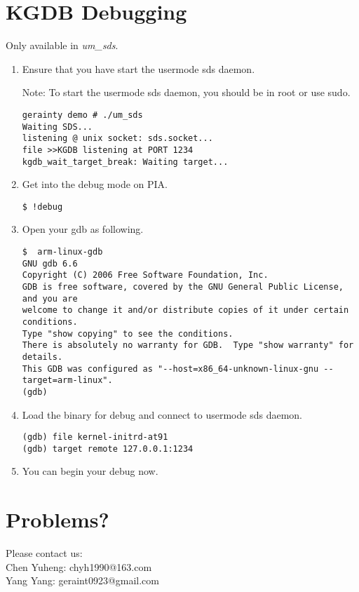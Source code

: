 \documentclass[a4paper]{article}
\begin{document}
\section{KGDB Debugging}
Only available in \emph{um\_sds}. 

\begin{enumerate}
\item Ensure that you have start the usermode sds daemon.

Note: To start the usermode sds daemon, you should be in root or use sudo.
\begin{verbatim}
gerainty demo # ./um_sds 
Waiting SDS...
listening @ unix socket: sds.socket...
file >>KGDB listening at PORT 1234
kgdb_wait_target_break: Waiting target...
\end{verbatim}

\item Get into the debug mode on PIA.


\begin{verbatim}
$ !debug
\end{verbatim}

\item Open your gdb as following.

{
\footnotesize
\begin{verbatim}
$  arm-linux-gdb
GNU gdb 6.6
Copyright (C) 2006 Free Software Foundation, Inc.
GDB is free software, covered by the GNU General Public License, and you are
welcome to change it and/or distribute copies of it under certain conditions.
Type "show copying" to see the conditions.
There is absolutely no warranty for GDB.  Type "show warranty" for details.
This GDB was configured as "--host=x86_64-unknown-linux-gnu --target=arm-linux".
(gdb) 
\end{verbatim}

}
\item Load the binary for debug and connect to usermode sds daemon.

\begin{verbatim}
(gdb) file kernel-initrd-at91
(gdb) target remote 127.0.0.1:1234
\end{verbatim}

\item You can begin your debug now.

\end{enumerate}

\section{Problems?}
Please contact us: \\
Chen Yuheng: chyh1990@163.com\\
Yang Yang: geraint0923@gmail.com
\end{document}
